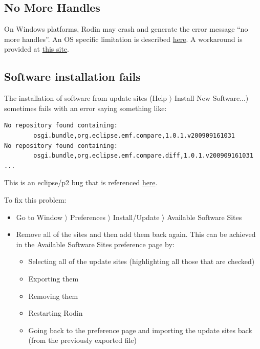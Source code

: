 \subsection{No More Handles}

On Windows platforms, Rodin may crash and generate the error message  ``no more handles''. An OS specific limitation is described \href{https://bugs.eclipse.org/bugs/show_bug.cgi?id=211124}{here}. A workaround is provided at \href{https://learn.microsoft.com/en-us/archive/blogs/ntdebugging/desktop-heap-overview}{this site}. 

\subsection{Software installation fails}

The installation of software from update sites (\textsf{Help $\rangle$ Install New Software...}) sometimes fails with an error saying something like: 

\begin{verbatim}
No repository found containing: 
        osgi.bundle,org.eclipse.emf.compare,1.0.1.v200909161031
No repository found containing: 
        osgi.bundle,org.eclipse.emf.compare.diff,1.0.1.v200909161031
...
\end{verbatim}


This is an eclipse/p2 bug that is referenced \href{https://stackoverflow.com/questions/511367/error-when-updating-eclipse}{here}. 

To fix this problem: 

\begin{itemize}
	\item Go to \textsf{Window $\rangle$ Preferences $\rangle$ Install/Update $\rangle$ Available Software Sites} 
	\item Remove all of the sites and then add them back again. This can be achieved in the \textsf{Available Software Sites} preference page by: 
	\begin{itemize}
		\item Selecting all  of the update sites (highlighting all those that are checked) 
		\item Exporting them 
		\item Removing them
		\item Restarting Rodin
		\item Going back to the preference page and importing the update sites back (from the previously exported file) 
	\end{itemize}
\end{itemize}

